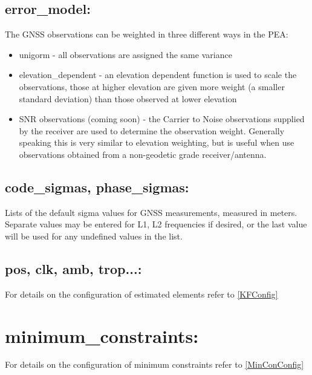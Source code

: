 \subsection*{error\_model:}

The GNSS observations can be weighted in three different ways in the PEA:
\begin{itemize}
    \item unigorm - all observations are assigned the same variance
    \item elevation\_dependent - an elevation dependent function is used to scale the observations, those at higher elevation are given more weight (a smaller standard deviation) than those observed at lower elevation
    \item SNR observations (coming soon) - the Carrier to Noise observations supplied by the receiver are used to determine the observation weight. Generally speaking this is very similar to elevation weighting, but is useful when use observations obtained from a non-geodetic grade receiver/antenna.
\end{itemize}

\subsection*{code\_sigmas, phase\_sigmas:}

Lists of the default sigma values for GNSS measurements, measured in meters.
Separate values may be entered for L1, L2 frequencies if desired, or the last value will be used for any undefined values in the list.

\subsection*{pos, clk, amb, trop...:}

For details on the configuration of estimated elements refer to \ref{KFConfig}

\section{minimum\_constraints:}

For details on the configuration of minimum constraints refer to \ref{MinConConfig}

